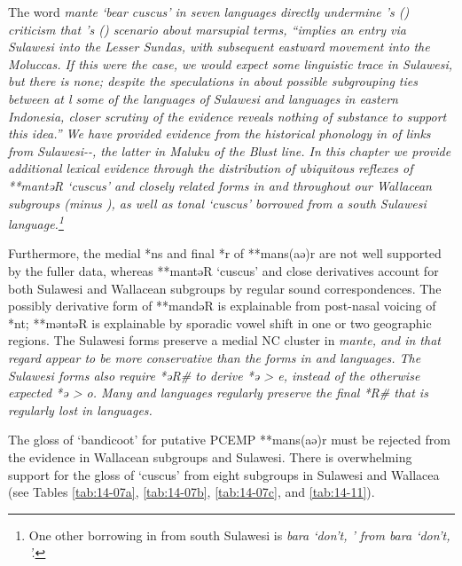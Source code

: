 The  word \it{mante} ‘bear cuscus’ in seven languages
directly undermine \citeauthor{Blust2012b}’s (\citeyear[274]{Blust2012b})
criticism that \citeauthor{Schapper2011}’s (\citeyear{Schapper2011}) scenario about marsupial terms,
“implies an entry via Sulawesi into the Lesser Sundas,
with subsequent eastward movement into the Moluccas.
If this were the case,
we would expect some linguistic trace in Sulawesi,
but there is none; despite the speculations in \citet{DonohueGrimes2008}
about possible subgrouping ties between at l some of the
languages of Sulawesi and languages in eastern Indonesia,
closer scrutiny of the evidence reveals nothing of substance
to support this idea.” We have provided evidence from the historical
phonology in  of links from  Sulawesi--,
the latter in Maluku  of the Blust line.
In this chapter we provide additional lexical evidence through
the distribution of ubiquitous reflexes of **mantəR ‘cuscus’
and closely related forms in 
and throughout our Wallacean subgroups (minus ),
as well as  \it{tonal} ‘cuscus’ borrowed from a south Sulawesi language.\footnote{
		One other borrowing in  from south Sulawesi is \it{bara}
		`don't, '
		from  \it{bara} `don't, '.}

Furthermore, the medial *ns
and final *r of **mans(aə)r are not well supported by the fuller
data, whereas **mantəR ‘cuscus’ and close derivatives account for both
Sulawesi and Wallacean subgroups by regular sound correspondences.
The possibly derivative form of **mandəR is explainable from
post-nasal voicing of *nt; **məntəR is explainable by sporadic
vowel shift in one or two geographic regions.
The Sulawesi forms preserve a medial NC cluster in \it{mante},
and in that regard appear to be more conservative than the forms
in  and  languages.
The Sulawesi forms also require *əR{\#} to derive *ə > \it{e},
instead of the otherwise expected *ə > \it{o}.
Many  and  languages
regularly preserve the final *R{\#} that is regularly lost in  languages.

The gloss of ‘bandicoot’ for putative PCEMP **mans(aə)r must
be rejected from the evidence in Wallacean subgroups
and Sulawesi.
There is overwhelming support for the gloss of ‘cuscus’ from
eight subgroups in Sulawesi
and Wallacea (see Tables \ref{tab:14-07a},
\ref{tab:14-07b}, \ref{tab:14-07c}, and \ref{tab:14-11}).

